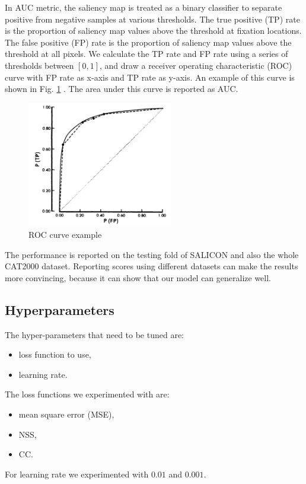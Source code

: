 \documentclass[12pt]{article}
\begin{document}
In AUC metric,
the saliency map is treated as a binary classifier to separate positive from negative samples at various thresholds. 
The true positive (TP) rate is the proportion of saliency map values above the threshold at fixation locations.
The false positive (FP) rate is the proportion of saliency map values above the threshold at all pixels.
We calculate the TP rate and FP rate using a series of thresholds between $[0, 1]$, and draw a
receiver operating characteristic (ROC) curve with FP rate as x-axis and TP rate as y-axis.
An example of this curve is shown in Fig. \ref{img:AUC} \cite{hanleyMeaningUseArea1982}.
The area under this curve is reported as AUC.

\begin{figure}[h!]
    \centering
    \includegraphics[width=2.5in]{imgs/AUC.png}
    \caption{ROC curve example\cite{hanleyMeaningUseArea1982}}
    \label{img:AUC}
\end{figure}


The performance is reported on the testing fold of SALICON and also the whole CAT2000 dataset.
Reporting scores using different datasets can make the results more convincing,
because it can show that our model can generalize well.

\subsection{Hyperparameters}
The hyper-parameters that need to be tuned are:
\begin{itemize}
    \item loss function to use,
    \item learning rate.
\end{itemize}

The loss functions we experimented with are:
\begin{itemize}
    \item mean square error (MSE),
    \item NSS,
    \item CC.
\end{itemize}
For learning rate we experimented with $0.01$ and $0.001$.
\end{document}

